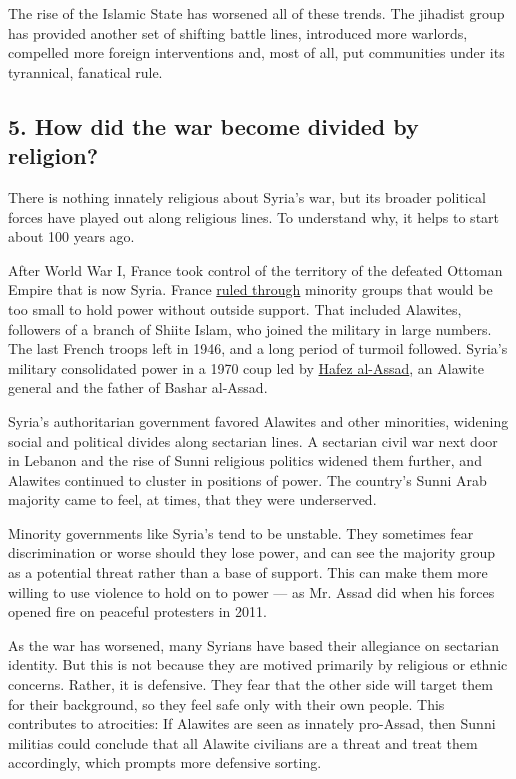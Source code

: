 The rise of the Islamic State has worsened all of these trends. The
jihadist group has provided another set of shifting battle lines,
introduced more warlords, compelled more foreign interventions and, most
of all, put communities under its tyrannical, fanatical rule.

\hypertarget{5-how-did-the-war-become-divided-by-religion}{%
\subsection{\texorpdfstring{\textbf{5. How did the war become divided by
religion?}}{5. How did the war become divided by religion?}}\label{5-how-did-the-war-become-divided-by-religion}}

There is nothing innately religious about Syria's war, but its broader
political forces have played out along religious lines. To understand
why, it helps to start about 100 years ago.

After World War I, France took control of the territory of the defeated
Ottoman Empire that is now Syria. France
\href{http://thelede.blogs.nytimes3xbfgragh.onion/2011/06/14/syrias-ruling-alawite-sect/}{ruled
through} minority groups that would be too small to hold power without
outside support. That included Alawites, followers of a branch of Shiite
Islam, who joined the military in large numbers. The last French troops
left in 1946, and a long period of turmoil followed. Syria's military
consolidated power in a 1970 coup led by
\href{http://www.nytimes3xbfgragh.onion/topic/person/hafez-alassad?8qa}{Hafez
al-Assad}, an Alawite general and the father of Bashar al-Assad.

Syria's authoritarian government favored Alawites and other minorities,
widening social and political divides along sectarian lines. A sectarian
civil war next door in Lebanon and the rise of Sunni religious politics
widened them further, and Alawites continued to cluster in positions of
power. The country's Sunni Arab majority came to feel, at times, that
they were underserved.

Minority governments like Syria's tend to be unstable. They sometimes
fear discrimination or worse should they lose power, and can see the
majority group as a potential threat rather than a base of support. This
can make them more willing to use violence to hold on to power --- as
Mr. Assad did when his forces opened fire on peaceful protesters in
2011.

As the war has worsened, many Syrians have based their allegiance on
sectarian identity. But this is not because they are motived primarily
by religious or ethnic concerns. Rather, it is defensive. They fear that
the other side will target them for their background, so they feel safe
only with their own people. This contributes to atrocities: If Alawites
are seen as innately pro-Assad, then Sunni militias could conclude that
all Alawite civilians are a threat and treat them accordingly, which
prompts more defensive sorting.

